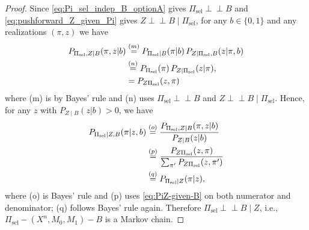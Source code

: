 \documentclass[onecolumn]{IEEEtran} %
\newcommand{\1}{\mathbbm{1}}
\theoremstyle{boldremark}
\newcommand{\pperp}{\mathrel{\perp\!\!\!\perp}}
\begin{document}
\begin{proof}
Since \eqref{eq:Pi_sel_indep_B_optionA} gives \(\Pi_{\mathrm{sel}}\pperp B\) and \eqref{eq:pushforward_Z_given_Pi} gives \(Z\pperp B\mid \Pi_{\mathrm{sel}}\),
for any \(b\in\{0,1\}\) and any realizations \((\pi,z)\) we have
\begin{align}
P_{\Pi_{\mathrm{sel}},Z\mid B}(\pi,z|b)
&\overset{(m)}{=}P_{\Pi_{\mathrm{sel}}\mid B}(\pi|b)\,P_{Z\mid \Pi_{\mathrm{sel}},B}(z|\pi,b)\notag\\
&\overset{(n)}{=}P_{\Pi_{\mathrm{sel}}}(\pi)\,P_{Z\mid \Pi_{\mathrm{sel}}}(z|\pi),\label{eq:PiZ-given-B}\\
&=P_{Z \Pi_{\mathrm{sel}}}(z,\pi)\label{eq:PiZ-given-B2}
\end{align}
where (m) is by Bayes' rule and (n) uses \(\Pi_{\mathrm{sel}}\pperp B\) and \(Z\pperp B\mid \Pi_{\mathrm{sel}}\).
Hence, for any \(z\) with \(P_{Z\mid B}(z|b)>0\), we have
\begin{align}
P_{\Pi_{\mathrm{sel}}\mid Z,B}(\pi|z,b)
&\overset{(o)}{=}\frac{P_{\Pi_{\mathrm{sel}},Z\mid B}(\pi,z|b)}{P_{Z\mid B}(z|b)}\notag\\
&\overset{(p)}{=}\frac{P_{Z \Pi_{\mathrm{sel}}}(z,\pi)}
{\sum_{\pi'} P_{Z \Pi_{\mathrm{sel}}}(z,\pi')}\notag\\
&\overset{(q)}{=}P_{\Pi_{\mathrm{sel}}\mid Z}(\pi|z),\label{eq:Pi-indep-B-given-Z}
\end{align}
where (o) is Bayes' rule and (p) uses \eqref{eq:PiZ-given-B} on both numerator and denominator; (q) follows Bayes' rule again.
Therefore \(\Pi_{\mathrm{sel}}\pperp B\mid Z\), i.e., \(\Pi_{\mathrm{sel}}-(X^n,M_0,M_1)-B\) is a Markov chain.


\end{proof}
\end{document}
